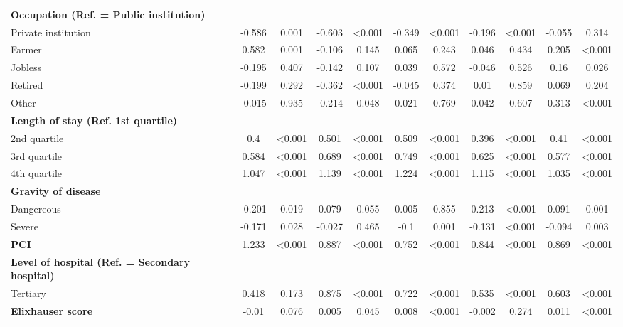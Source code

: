 \documentclass[ijerph,article,submit,moreauthors,pdftex,10pt,a4paper]{mdpi}
\theoremstyle{mdpi}
\newcounter{ex}
\newcounter{re}
\theoremstyle{mdpidefinition}
\begin{document}
\begin{landscape}
\begin{table}[]
{\begin{tabular}{@{}lcccccccccc@{}}
\textbf{Occupation (Ref. = Public institution)}  &  &  &  &  &  &  &  &  &  &  \\
\quad Private institution & -0.586 & 0.001 & -0.603 & \textless{}0.001 & -0.349 & \textless{}0.001 & -0.196 & \textless{}0.001 & -0.055 & 0.314 \\
\quad Farmer & 0.582 & 0.001 & -0.106 & 0.145 & 0.065 & 0.243 & 0.046 & 0.434 & 0.205 & \textless{}0.001 \\
\quad Jobless & -0.195 & 0.407 & -0.142 & 0.107 & 0.039 & 0.572 & -0.046 & 0.526 & 0.16 & 0.026 \\
\quad Retired & -0.199 & 0.292 & -0.362 & \textless{}0.001 & -0.045 & 0.374 & 0.01 & 0.859 & 0.069 & 0.204 \\
\quad Other & -0.015 & 0.935 & -0.214 & 0.048 & 0.021 & 0.769 & 0.042 & 0.607 & 0.313 & \textless{}0.001 \\
\textbf{Length of stay (Ref. 1st quartile)} &  &  &  &  &  &  &  &  &  &  \\
\quad 2nd quartile & 0.4 & \textless{}0.001 & 0.501 & \textless{}0.001 & 0.509 & \textless{}0.001 & 0.396 & \textless{}0.001 & 0.41 & \textless{}0.001 \\
\quad 3rd quartile & 0.584 & \textless{}0.001 & 0.689 & \textless{}0.001 & 0.749 & \textless{}0.001 & 0.625 & \textless{}0.001 & 0.577 & \textless{}0.001 \\
\quad 4th quartile & 1.047 & \textless{}0.001 & 1.139 & \textless{}0.001 & 1.224 & \textless{}0.001 & 1.115 & \textless{}0.001 & 1.035 & \textless{}0.001 \\
\textbf{Gravity of disease} &  &  &  &  &  &  &  &  &  &  \\
\quad Dangereous & -0.201 & 0.019 & 0.079 & 0.055 & 0.005 & 0.855 & 0.213 & \textless{}0.001 & 0.091 & 0.001 \\
\quad Severe & -0.171 & 0.028 & -0.027 & 0.465 & -0.1 & 0.001 & -0.131 & \textless{}0.001 & -0.094 & 0.003 \\
\textbf{PCI} & 1.233 & \textless{}0.001 & 0.887 & \textless{}0.001 & 0.752 & \textless{}0.001 & 0.844 & \textless{}0.001 & 0.869 & \textless{}0.001 \\
\textbf{Level of hospital (Ref. =  Secondary hospital)} &  &  &  &  &  &  &  &  &  &  \\
\quad Tertiary & 0.418 & 0.173 & 0.875 & \textless{}0.001 & 0.722 & \textless{}0.001 & 0.535 & \textless{}0.001 & 0.603 & \textless{}0.001 \\
\textbf{Elixhauser score} & -0.01 & 0.076 & 0.005 & 0.045 & 0.008 & \textless{}0.001 & -0.002 & 0.274 & 0.011 & \textless{}0.001 \\ \bottomrule 
\end{tabular}
}
\end{table}
\end{landscape}
\end{document}
